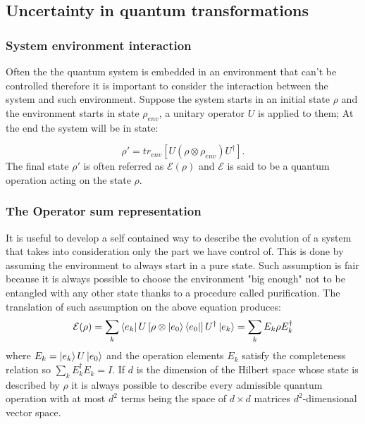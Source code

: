 \documentclass{article}
\begin{document}
\subsection{Uncertainty in quantum transformations}

\subsubsection{System environment interaction}

Often the  the quantum system is embedded in an environment that can't be
controlled therefore it is important to consider the interaction
between the system and such environment.
Suppose the system starts in an initial state $\rho$ and the environment
starts in state $\rho_{env}$, a unitary operator $U$ is applied to them;
At the end the system will be in state:

\begin{equation}
	\rho' = tr_{env} \left[U (\rho \otimes \rho_{env})U^\dag \right].
\end{equation}
The final state $\rho'$ is often referred as $\mathcal {E}(\rho)$ and
$\mathcal {E}$ is said to be a quantum operation acting on the state $\rho$.

\subsubsection{The Operator sum representation}

It is useful to develop a self contained way to describe the evolution
of a system that takes into consideration only the part we have control of.
This is done by assuming the environment to always start in a pure state.
Such assumption is fair because it is always possible to choose the environment
"big enough" not to be entangled with any other state thanks to a procedure
called purification.
The translation of such assumption on the above equation produces:
\begin{equation}
	\mathcal{E}(\rho) =  \sum_{k} \bra{e_k}U \left[ \rho \otimes \ket{e_0}\bra{e_0}
		\right] U^\dagger \ket{e_k} = \sum_k E_k \rho E_k^\dagger  \\
\end{equation}
where $E_k=\ket{e_k}U\ket{e_0}$ and the operation elements $E_k$ satisfy
the completeness relation so $\sum_k E_k^\dagger E_k = I$.
If $d$ is the dimension of the Hilbert space whose state is described by
$\rho$ it is always possible to describe every admissible quantum operation
with at most $d^2$ terms being the space of $d \times d $ matrices $d^2$-dimensional
vector space.
\end{document}
